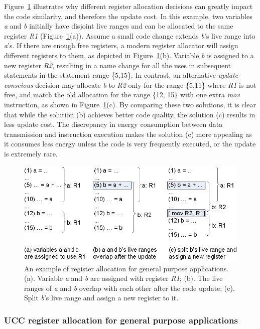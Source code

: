 Figure~\ref{freg0} illustrates why different register
allocation decisions can greatly impact the code similarity, and therefore the
update cost. In this example, two variables {\it a} and {\it b}
initially have disjoint live ranges and can be allocated to the same
register {\it R1} (Figure~\ref{freg0}(a)). Assume a small code change
extends {\it b}'s live range into {\it a}'s. If there are enough free
registers, a modern register allocator will assign different registers
to them, as depicted in Figure~\ref{freg0}(b).  Variable {\it b} is
assigned to a new register {\it R2}, resulting in a name change for
all the uses in subsequent statements in the statement range \{5,15\}.
In contrast, an alternative {\em update-conscious} decision may
allocate {\it b} to {\it R2} only for the range \{5,11\} where {\it
R1} is not free, and match the old allocation for the range \{12, 15\}
with one extra {\it mov} instruction, as shown in Figure~\ref{freg0}(c). By comparing these two solutions, it is clear that
while the solution (b) achieves better code quality, the solution (c)
results in less update cost. The discrepancy in energy consumption
between data transmission and instruction execution makes the solution
(c) more appealing as it consumes less energy unless the code is very
frequently executed, or the update is extremely rare.

\begin{figure}
\centering
\includegraphics[scale=1.2]{figures/freg.0.eps}
\caption[An example of register allocation for general purpose applications.]{An example of register allocation for general purpose applications.
(a). Variable {\it a} and {\it b} are assigned with register {\it R1};
(b). The live ranges of {\it a} and {\it b} overlap with each other after the code update;
(c). Split {\it b}'s live range and assign a new register to it.}
\label{freg0}
\end{figure}


\subsubsection{UCC register allocation for general purpose applications}\label{secra}
%

